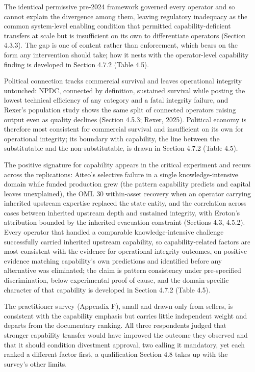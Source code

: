 The identical permissive pre-2024 framework governed every operator and
so cannot explain the divergence among them, leaving regulatory
inadequacy as the common system-level enabling condition that permitted
capability-deficient transfers at scale but is insufficient on its own
to differentiate operators (Section 4.3.3). The gap is one of content
rather than enforcement, which bears on the form any intervention should
take; how it nests with the operator-level capability finding is
developed in Section 4.7.2 (Table 4.5).

Political connection tracks commercial survival and leaves operational
integrity untouched: NPDC, connected by definition, sustained survival
while posting the lowest technical efficiency of any category and a
fatal integrity failure, and Rexer's population study shows the same
split of connected operators raising output even as quality declines
(Section 4.5.3; Rexer, 2025). Political economy is therefore most
consistent for commercial survival and insufficient on its own for
operational integrity; its boundary with capability, the line between
the substitutable and the non-substitutable, is drawn in Section 4.7.2
(Table 4.5).

The positive signature for capability appears in the critical experiment
and recurs across the replications: Aiteo's selective failure in a
single knowledge-intensive domain while funded production grew (the
pattern capability predicts and capital leaves unexplained), the OML 30
within-asset recovery when an operator carrying inherited upstream
expertise replaced the state entity, and the correlation across cases
between inherited upstream depth and sustained integrity, with Eroton's
attribution bounded by the inherited evacuation constraint (Sections
4.3, 4.5.2). Every operator that handled a comparable
knowledge-intensive challenge successfully carried inherited upstream
capability, so capability-related factors are most consistent with the
evidence for operational-integrity outcomes, on positive evidence
matching capability's own predictions and identified before any
alternative was eliminated; the claim is pattern consistency under
pre-specified discrimination, below experimental proof of cause, and the
domain-specific character of that capability is developed in Section
4.7.2 (Table 4.5).

The practitioner survey (Appendix F), small and drawn only from sellers,
is consistent with the capability emphasis but carries little
independent weight and departs from the documentary ranking. All three
respondents judged that stronger capability transfer would have improved
the outcome they observed and that it should condition divestment
approval, two calling it mandatory, yet each ranked a different factor
first, a qualification Section 4.8 takes up with the survey's other
limits.

